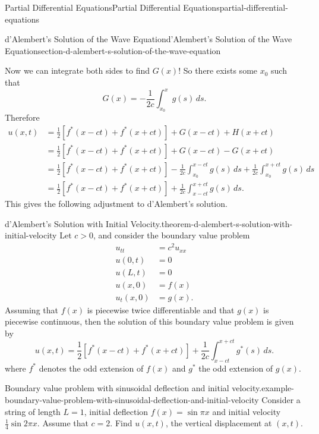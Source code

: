 \documentclass[oneside,10pt,]{book}
\numberwithin{equation}{section}
\newcommand{\gt}{>}
\newcommand{\amp}{&}
\begin{document}
\begin{chapterptx}{Partial Differential Equations}{}{Partial Differential Equations}{}{}{partial-differential-equations}
\begin{sectionptx}{d'Alembert's Solution of the Wave Equation}{}{d'Alembert's Solution of the Wave Equation}{}{}{section-d-alembert-s-solution-of-the-wave-equation}
\begin{equation*}
\end{equation*}
%
\par
\hypertarget{p-682}{}%
Now we can integrate both sides to find \(G(x)\)! So there exists some \(x_{0}\) such that%
\begin{equation*}
G(x) = -\frac{1}{2c}\int_{x_{0}}^{x}g(s)\,ds.
\end{equation*}
Therefore%
\begin{align*}
u(x,t) \amp = \frac{1}{2}[f^{*}(x-ct)+f^{*}(x+ct)] + G(x-ct) + H(x+ct) \\
\amp = \frac{1}{2}[f^{*}(x-ct)+f^{*}(x+ct)] + G(x-ct) - G(x+ct) \\
\amp = \frac{1}{2}[f^{*}(x-ct)+f^{*}(x+ct)] - \frac{1}{2c}\int_{x_{0}}^{x-ct}g(s)\,ds + \frac{1}{2c}\int_{x_{0}}^{x+ct}g(s)\,ds \\
\amp = \frac{1}{2}[f^{*}(x-ct)+f^{*}(x+ct)] + \frac{1}{2c}\int_{x-ct}^{x+ct}g(s)\,ds \text{.}
\end{align*}
This gives the following adjustment to d'Alembert's solution.%
\begin{theorem}{d'Alembert's Solution with Initial Velocity.}{}{theorem-d-alembert-s-solution-with-initial-velocity}%
\hypertarget{p-683}{}%
Let \(c\gt0\), and consider the boundary value problem%
%
\begin{align*}
u_{tt} \amp = c^{2}u_{xx} \\
u(0,t) \amp = 0 \\
u(L,t) \amp = 0 \\
u(x,0) \amp = f(x) \\
u_{t}(x,0) \amp = g(x). 
\end{align*}
\hypertarget{p-684}{}%
Assuming that \(f(x)\) is piecewise twice differentiable and that \(g(x)\) is piecewise continuous, then the solution of this boundary value problem is given by%
\begin{equation*}
u(x,t) = \frac{1}{2}[f^{*}(x-ct)+f^{*}(x+ct)] + \frac{1}{2c}\int_{x-ct}^{x+ct}g^{*}(s)\,ds.
\end{equation*}
where \(f^{*}\) denotes the odd extension of \(f(x)\) and \(g^{*}\) the odd extension of \(g(x)\).%
\end{theorem}
\begin{example}{Boundary value problem with sinusoidal deflection and initial velocity.}{example-boundary-value-problem-with-sinusoidal-deflection-and-initial-velocity}%
\hypertarget{p-685}{}%
Consider a string of length \(L=1\), initial deflection \(f(x) = \sin\pi x\) and initial velocity \(\frac{1}{4}\sin2\pi x\). Assume that \(c = 2\). Find \(u(x,t)\), the vertical displacement at \((x,t)\).%

\end{example}
\end{sectionptx}
\end{chapterptx}
\end{document}

